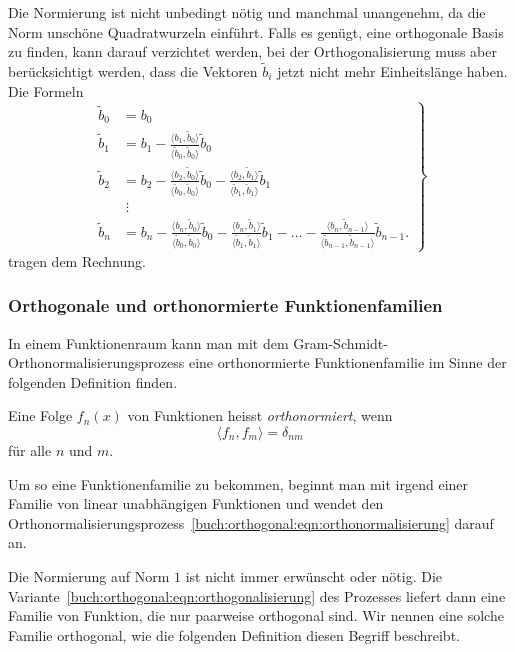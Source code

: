 Die Normierung ist nicht unbedingt nötig und manchmal unangenehm,
da die Norm unschöne Quadratwurzeln einführt.
Falls es genügt, eine orthogonale Basis zu finden, kann darauf
verzichtet werden, bei der Orthogonalisierung muss aber berücksichtigt
werden, dass die Vektoren $\tilde{b}_i$ jetzt nicht mehr Einheitslänge
haben.
Die Formeln
\begin{equation}
\left.
\begin{aligned}
\tilde{b}_0
&=
b_0
\\
\tilde{b}_1
&=
b_1
-
\frac{\langle b_1,\tilde{b}_0\rangle}{\langle \tilde{b}_0,\tilde{b}_0\rangle}\tilde{b}_0
\\
\tilde{b}_2
&=
b_2
-
\frac{\langle b_2,\tilde{b}_0\rangle}{\langle \tilde{b}_0,\tilde{b}_0\rangle}\tilde{b}_0
-
\frac{\langle b_2,\tilde{b}_1\rangle}{\langle \tilde{b}_1,\tilde{b}_1\rangle}\tilde{b}_1
\\
&\;\vdots
\\
\tilde{b}_n
&=
b_n
-
\frac{\langle b_n,\tilde{b}_0\rangle}{\langle \tilde{b}_0,\tilde{b}_0\rangle}\tilde{b}_0
-
\frac{\langle b_n,\tilde{b}_1\rangle}{\langle \tilde{b}_1,\tilde{b}_1\rangle}\tilde{b}_1
-
\dots
-
\frac{\langle b_n,\tilde{b}_{n-1}\rangle}{\langle \tilde{b}_{n-1},\tilde{b}_{n-1}\rangle}\tilde{b}_{n-1}.
\end{aligned}
\right\}
\label{buch:orthogonal:eqn:orthogonalisierung}
\end{equation}
tragen dem Rechnung.

%
%
\subsubsection{Orthogonale und orthonormierte Funktionenfamilien}
In einem Funktionenraum kann man mit dem
Gram-Schmidt-Orthonormalisierungsprozess eine 
orthonormierte Funktionenfamilie im Sinne der folgenden Definition
finden.

\begin{definition}
Eine Folge $f_n(x)$ von Funktionen heisst {\em orthonormiert}, wenn 
%
\[
\langle f_n,f_m\rangle = \delta_{nm}
\]
für alle $n$ und $m$.
\end{definition}

Um so eine Funktionenfamilie zu bekommen, beginnt man mit irgend
einer Familie von linear unabhängigen Funktionen und wendet den
Orthonormalisierungsprozess~\eqref{buch:orthogonal:eqn:orthonormalisierung}
darauf an.

Die Normierung auf Norm $1$ ist nicht immer erwünscht oder nötig. 
Die Variante~\eqref{buch:orthogonal:eqn:orthogonalisierung}
des Prozesses liefert dann eine Familie von Funktion, die nur
paarweise orthogonal sind.
Wir nennen eine solche Familie orthogonal, wie die folgenden Definition
diesen Begriff beschreibt.

